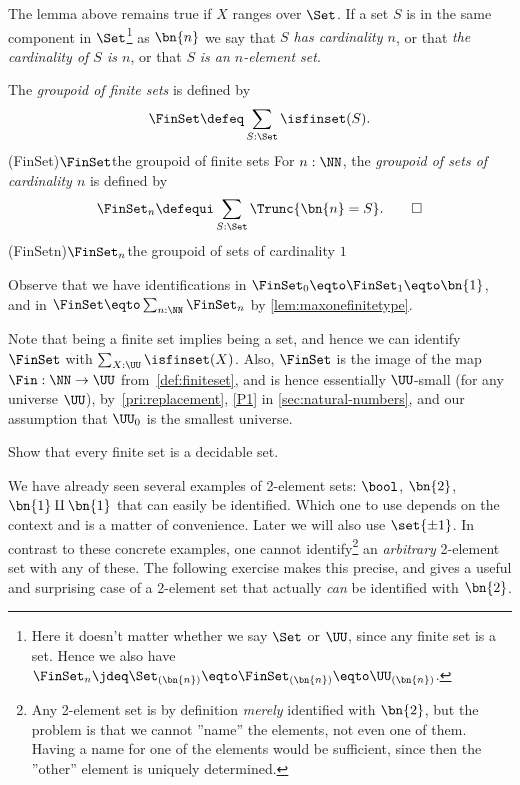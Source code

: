 The lemma above remains true if $X$ ranges over $\Set$.
If a set $S$ is in the same component in $\Set$\footnote{%
  Here it doesn't matter whether we say $\Set$ or $\UU$,
  since any finite set is a set.
  Hence we also have $\FinSet_n
  \jdeq \Set_{(\bn{n})} \eqto \FinSet_{(\bn{n})}
 \eqto \UU_{(\bn{n})}$.}
as $\bn{n}$ we say that \emph{$S$ has cardinality $n$}, 
or that \emph{the cardinality of $S$ is $n$}, 
or that $S$ \emph{is an $n$-element set}.

\begin{definition}\label{def:groupoidFin}
The \emph{groupoid of finite sets} is defined by
\[
  \FinSet\defeq\sum_{S:\Set}\isfinset(S).
\]
\glossary(FinSet){$\protect\FinSet$}{the groupoid of finite sets}
For $n:\NN$, the \emph{groupoid of sets of cardinality $n$} is defined by
\[
  \FinSet_n\defequi \sum_{S:\Set}\Trunc{\bn{n} = S}.\qedhere
\]
\glossary(FinSetn){$\protect\FinSet_n$}{the groupoid of sets of cardinality $1$}
\end{definition}
Observe that we have identifications in
$\FinSet_0 \eqto \FinSet_1 \eqto \bn{1} $, and in
$\FinSet \eqto \sum_{n:\NN}\FinSet_n$ by \cref{lem:maxonefinitetype}.

Note that being a finite set implies being a set, and hence
we can identify $\FinSet$ with $\sum_{X:\UU}\isfinset(X)$.
Also, $\FinSet$ is the image of the map $\Fin : \NN \to \UU$
from~\cref{def:finiteset}, and is hence essentially $\UU$-small
(for any universe $\UU$), by~\cref{pri:replacement}, \cref{P1} in
\cref{sec:natural-numbers}, and our assumption
that $\UU_0$ is the smallest universe.

\begin{xca}\label{xca:finsets-decidable}
Show that every finite set is a decidable set.
\end{xca}

We have already seen several examples of 2-element sets:
$\bool$, $\bn{2}$, $\bn{1}\amalg\bn{1}$ that can easily
be identified. Which one to use
depends on the context and is a matter of convenience.
Later we will also use $\set{\pm1}$. In contrast
to these concrete examples, one cannot identify\footnote{%
Any 2-element set is by definition \emph{merely} identified
with $\bn{2}$, but the problem is that we cannot ''name''
the elements, not even one of them. Having a name for one
of the elements would be sufficient, since then the ''other''
element is uniquely determined.}
an \emph{arbitrary} 2-element set with any of these.
The following exercise makes this precise, and gives a
useful and surprising case of a 2-element set
that actually \emph{can} be identified with $\bn{2}$.

